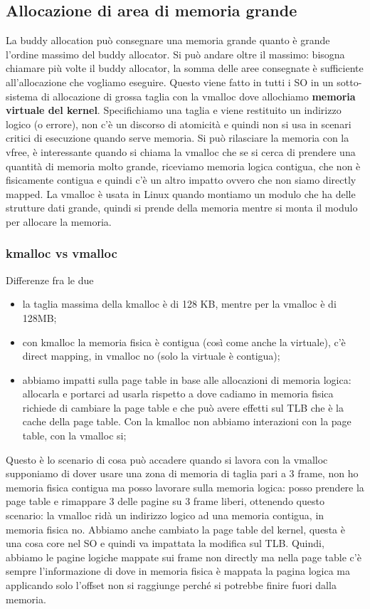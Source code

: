 \documentclass[12pt, oneside]{extbook}
\begin{document}
\subsection{Allocazione di area di memoria grande}
La buddy allocation può consegnare una memoria grande quanto è grande l'ordine massimo del buddy allocator. Si può andare oltre il massimo: bisogna chiamare più volte il buddy allocator, la somma delle aree consegnate è sufficiente all'allocazione che vogliamo eseguire. Questo viene fatto in tutti i SO in un sotto-sistema di allocazione di grossa taglia con la \textsf{vmalloc} dove allochiamo \textbf{memoria virtuale del kernel}. Specifichiamo una taglia e viene restituito un indirizzo logico (o errore), non c'è un discorso di atomicità e quindi non si usa in scenari critici di esecuzione quando serve memoria. Si può rilasciare la memoria con la \textsf{vfree}, è interessante quando si chiama la vmalloc che se si cerca di prendere una quantità di memoria molto grande, riceviamo memoria logica contigua, che non è fisicamente contigua e quindi c'è un altro impatto ovvero che non siamo directly mapped. La vmalloc è usata in Linux quando montiamo un modulo che ha delle strutture dati grande, quindi si prende della memoria mentre si monta il modulo per allocare la memoria.
\subsubsection{kmalloc vs vmalloc}
Differenze fra le due
\begin{itemize}
\item la taglia massima della kmalloc è di 128 KB, mentre per la vmalloc è di 128MB;
\item con kmalloc la memoria fisica è contigua (così come anche la virtuale), c'è direct mapping, in vmalloc no (solo la virtuale è contigua);
\item abbiamo impatti sulla page table in base alle allocazioni di memoria logica: allocarla e portarci ad usarla rispetto a dove cadiamo in memoria fisica richiede di cambiare la page table e che può avere effetti sul TLB che è la cache della page table. Con la kmalloc non abbiamo interazioni con la page table, con la vmalloc si;
\end{itemize}
Questo è lo scenario di cosa può accadere quando si lavora con la vmalloc
supponiamo di dover usare una zona di memoria di taglia pari a 3 frame, non ho memoria fisica contigua ma posso lavorare sulla memoria logica: posso prendere la page table e rimappare 3 delle pagine su 3 frame liberi, ottenendo questo scenario:
la vmalloc ridà un indirizzo logico ad una memoria contigua, in memoria fisica no. Abbiamo anche cambiato la page table del kernel, questa è una cosa core nel SO e quindi va impattata la modifica sul TLB. Quindi, abbiamo le pagine logiche mappate sui frame non directly ma nella page table c'è sempre l'informazione di dove in memoria fisica è mappata la pagina logica ma applicando solo l'offset non si raggiunge perché si potrebbe finire fuori dalla memoria.
\end{document}
